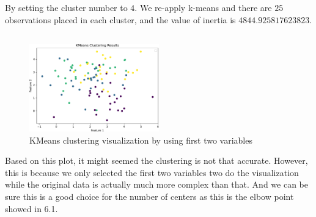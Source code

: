 \documentclass{article}
\begin{document}
\subsection{}
By setting the cluster number to $4$. We re-apply k-means and there are $25$ observations placed in each cluster, and the value of inertia is $4844.925817623823$.
\subsection{}
\begin{figure}[htbp]
    \begin{center}
        \includegraphics[width=0.5\textwidth]{./assist/kmeans_clustering_results.pdf}
        \caption{KMeans clustering visualization by using first two variables}
    \end{center}
\end{figure}
Based on this plot, it might seemed the clustering is not that accurate. However, this is because we only selected the first two variables two do the visualization while the original data is actually much more complex than that. And we can be sure this is a good choice for the number of centers as this is the elbow point showed in 6.1.
\end{document}

